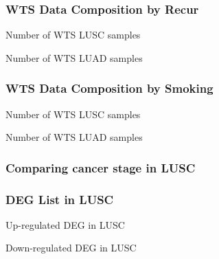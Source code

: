 \documentclass{beamer}
\begin{document}
    \begin{frame}[allowframebreaks]
        \frametitle{WTS Data Composition by Recur}

        \begin{table}
            \caption{Number of WTS LUSC samples}
            
        \end{table}

        \begin{table}
            \caption{Number of WTS LUAD samples}
            
        \end{table}
    \end{frame}

    \begin{frame}[allowframebreaks]
        \frametitle{WTS Data Composition by Smoking}

        \begin{table}
            \caption{Number of WTS LUSC samples}
            \resizebox{!}{0.3 \textheight}
            {}
        \end{table}

        \begin{table}
            \caption{Number of WTS LUAD samples}
            \resizebox{!}{0.3 \textheight}
            {}
        \end{table}
    \end{frame}

    \subsubsection{Comparing cancer stage in LUSC}
    \begin{frame}
        \frametitle{DEG List in LUSC}

        \begin{table}
            \caption{Up-regulated DEG in LUSC}
            
        \end{table}

        \begin{table}
            \caption{Down-regulated DEG in LUSC}
            
        \end{table}
    \end{frame}
\end{document}
